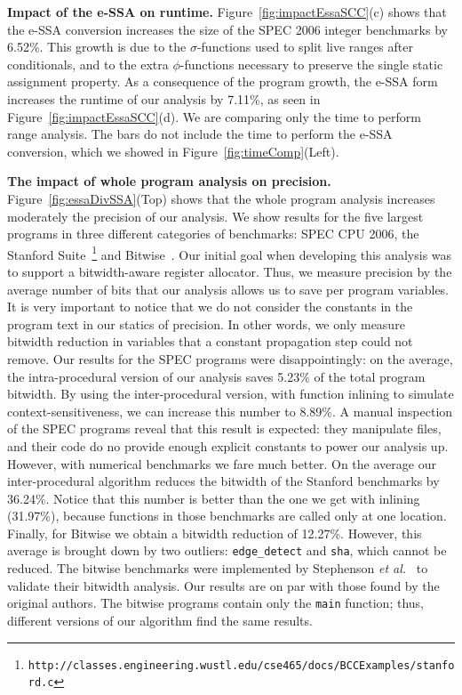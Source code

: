\documentclass{llncs}
\begin{document}
\noindent
\textbf{Impact of the e-SSA on runtime.}
Figure~\ref{fig:impactEssaSCC}(c) shows that the e-SSA conversion increases
the size of the SPEC 2006 integer benchmarks by 6.52\%.
This growth is due to the $\sigma$-functions used to split live ranges
after conditionals, and to the extra $\phi$-functions necessary to preserve the
single static assignment property.
As a consequence of the program growth, the e-SSA form increases the runtime of
our analysis by 7.11\%, as seen in Figure~\ref{fig:impactEssaSCC}(d).
We are comparing only the time to perform range analysis.
The bars do not include the time to perform the e-SSA conversion, which we
showed in Figure~\ref{fig:timeComp}(Left).

\noindent
\textbf{The impact of whole program analysis on precision.}
Figure~\ref{fig:essaDivSSA}(Top) shows that the whole program analysis increases
moderately the precision of our analysis.
We show results for the five largest programs in three different categories of
benchmarks: SPEC CPU 2006, the Stanford Suite~\footnote{\texttt{http://classes.engineering.wustl.edu/cse465/docs/BCCExamples/stanford.c}} and
Bitwise~\cite{Stephenson00}.
Our initial goal when developing this analysis was to support a bitwidth-aware
register allocator.
Thus, we measure precision by the average number of bits that our
analysis allows us to save per program variables.
It is very important to notice that we do not consider the constants in the
program text in our statics of precision.
In other words, we only measure bitwidth reduction in variables that a constant
propagation step could not remove.
Our results for the SPEC programs were disappointingly: on the average, the
intra-procedural version of our analysis saves 5.23\% of the total program
bitwidth.
By using the inter-procedural version, with function inlining to simulate
context-sensitiveness, we can increase this number to 8.89\%.
A manual inspection of the SPEC programs reveal that this result is expected:
they manipulate files, and their code do no provide enough
explicit constants to power our analysis up.
However, with numerical benchmarks we fare much better.
On the average our inter-procedural algorithm reduces the bitwidth of the
Stanford benchmarks by 36.24\%.
Notice that this number is better than the one we get with inlining (31.97\%),
because functions in those benchmarks are called only at one location.
Finally, for Bitwise we obtain a bitwidth reduction of 12.27\%.
However, this average is brought down by two outliers: \texttt{edge\_detect} and
\texttt{sha}, which cannot be reduced.
The bitwise benchmarks were implemented by Stephenson
{\em et al.}~\cite{Stephenson00} to validate their bitwidth analysis.
Our results are on par with those found by the original authors.
The bitwise programs contain only the \texttt{main} function; thus, different
versions of our algorithm find the same results.
\end{document}
